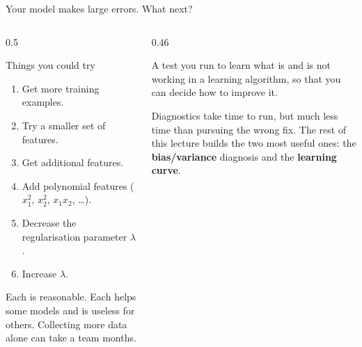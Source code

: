 \documentclass[aspectratio=169,10pt]{beamer}
\begin{document}
\begin{frame}{Your model makes large errors. What next?}
  \begin{columns}[T,onlytextwidth]
    \begin{column}{0.5\textwidth}
      \begin{block}{Things you could try}
        \footnotesize
        \begin{enumerate}
          \item Get more training examples.
          \item Try a smaller set of features.
          \item Get additional features.
          \item Add polynomial features ($x_1^2$, $x_2^2$, $x_1x_2$, \dots).
          \item Decrease the regularisation parameter $\lambda$.
          \item Increase $\lambda$.
        \end{enumerate}
      \end{block}
      \footnotesize
      Each is reasonable. Each helps some models and is useless for others. Collecting more
      data alone can take a team months.
    \end{column}
    \begin{column}{0.46\textwidth}
      \begin{defnbox}[Diagnostic]
        \small A test you run to learn what is and is not working in a learning algorithm,
        so that you can decide how to improve it.
      \end{defnbox}
      \begin{keyidea}
        Diagnostics take time to run, but much less time than pursuing the wrong fix. The
        rest of this lecture builds the two most useful ones: the \textbf{bias/variance}
        diagnosis and the \textbf{learning curve}.
      \end{keyidea}
    \end{column}
  \end{columns}
\end{frame}
\end{document}
